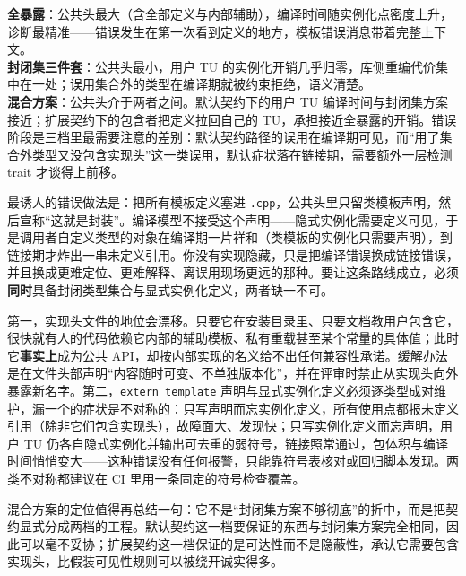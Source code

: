 \documentclass[12pt,a4paper,fontset=fandol]{ctexbook}
\newcommand{\kw}[1]{\texttt{#1}}
\begin{document}
\begin{compare}[title={三档契约下的头文件体积、编译时间与错误阶段}]
\textbf{全暴露}：公共头最大（含全部定义与内部辅助），编译时间随实例化点密度上升，诊断最精准——错误发生在第一次看到定义的地方，模板错误消息带着完整上下文。\\[2pt]
\textbf{封闭集三件套}：公共头最小，用户 TU 的实例化开销几乎归零，库侧重编代价集中在一处；误用集合外的类型在编译期就被约束拒绝，语义清楚。\\[2pt]
\textbf{混合方案}：公共头介于两者之间。默认契约下的用户 TU 编译时间与封闭集方案接近；扩展契约下的包含者把定义拉回自己的 TU，承担接近全暴露的开销。错误阶段是三档里最需要注意的差别：默认契约路径的误用在编译期可见，而“用了集合外类型又没包含实现头”这一类误用，默认症状落在链接期，需要额外一层检测 trait 才谈得上前移。
\end{compare}

\begin{note}[title={不要用只暴露接口的做法实现开放式泛型}]
最诱人的错误做法是：把所有模板定义塞进 \kw{.cpp}，公共头里只留类模板声明，然后宣称“这就是封装”。编译模型不接受这个声明——隐式实例化需要定义可见，于是调用者自定义类型的对象在编译期一片祥和（类模板的实例化只需要声明），到链接期才炸出一串未定义引用。你没有实现隐藏，只是把编译错误换成链接错误，并且换成更难定位、更难解释、离误用现场更远的那种。要让这条路线成立，必须\textbf{同时}具备封闭类型集合与显式实例化定义，两者缺一不可。
\end{note}

\begin{warning}[title={混合方案的两项长期维护风险}]
第一，实现头文件的地位会漂移。只要它在安装目录里、只要文档教用户包含它，很快就有人的代码依赖它内部的辅助模板、私有重载甚至某个常量的具体值；此时它\textbf{事实上}成为公共 API，却按内部实现的名义给不出任何兼容性承诺。缓解办法是在文件头部声明“内容随时可变、不单独版本化”，并在评审时禁止从实现头向外暴露新名字。第二，\kw{extern template} 声明与显式实例化定义必须逐类型成对维护，漏一个的症状是不对称的：只写声明而忘实例化定义，所有使用点都报未定义引用（除非它们包含实现头），故障面大、发现快；只写实例化定义而忘声明，用户 TU 仍各自隐式实例化并输出可去重的弱符号，链接照常通过，包体积与编译时间悄悄变大——这种错误没有任何报警，只能靠符号表核对或回归脚本发现。两类不对称都建议在 CI 里用一条固定的符号检查覆盖。
\end{warning}

混合方案的定位值得再总结一句：它不是“封闭集方案不够彻底”的折中，而是把契约显式分成两档的工程。默认契约这一档要保证的东西与封闭集方案完全相同，因此可以毫不妥协；扩展契约这一档保证的是可达性而不是隐蔽性，承认它需要包含实现头，比假装可见性规则可以被绕开诚实得多。
\end{document}
